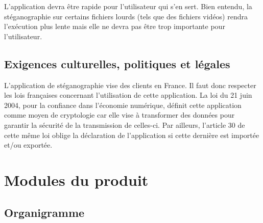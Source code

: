 \documentclass[11pt]{article}
\begin{document}
L'application devra être rapide pour l'utilisateur qui s'en sert. Bien entendu,
la stéganographie sur certains fichiers lourds (tels que des fichiers vidéos)
rendra l'exécution plus lente mais elle ne devra pas être trop importante pour
l'utilisateur. 

\subsection{Exigences culturelles, politiques et légales}

L'application de stéganographie vise des clients en France. Il faut donc
respecter les lois françaises concernant l'utilisation de cette application. La
loi du 21 juin 2004, pour la confiance dans l'économie numérique, définit cette
application comme moyen de cryptologie car elle vise à transformer des données
pour garantir la sécurité de la transmission de celles-ci. Par ailleurs,
l'article 30 de cette même loi oblige la déclaration de l'application si cette
dernière est importée et/ou exportée. 

\section{Modules du produit}

\subsection{Organigramme}
\end{document}
